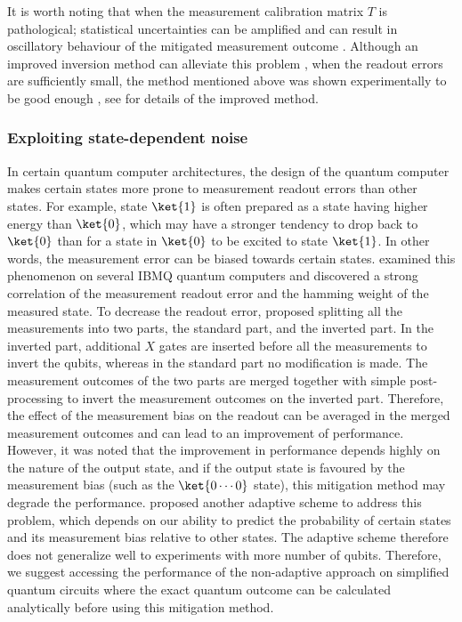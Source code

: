 
It is worth noting that when the measurement calibration matrix $T$ is pathological; statistical uncertainties can be amplified and can result in oscillatory behaviour of the mitigated measurement outcome \cite{nachmanUnfoldingQuantumComputer2020}. Although an improved inversion method can alleviate this problem \cite{nachmanUnfoldingQuantumComputer2020}, when the readout errors are sufficiently small, the method mentioned above was shown experimentally to be good enough \cite{nachmanUnfoldingQuantumComputer2020}, see \citet{nachmanUnfoldingQuantumComputer2020} for details of the improved method.

\subsubsection{Exploiting state-dependent noise}

In certain quantum computer architectures, the design of the quantum computer makes certain states more prone to measurement readout errors than other states. For example, state $\ket{1}$ is often prepared as a state having higher energy than $\ket{0}$, which may have a stronger tendency to drop back to $\ket{0}$ than for a state in $\ket{0}$ to be excited to state $\ket{1}$. In other words, the measurement error can be biased towards certain states. \citet{tannuMitigatingMeasurementErrors2019} examined this phenomenon on several IBMQ quantum computers and discovered a strong correlation of the measurement readout error and the hamming weight of the measured state.
To decrease the readout error, \citet{tannuMitigatingMeasurementErrors2019} proposed splitting all the measurements into two parts, the standard part, and the inverted part. In the inverted part, additional $X$ gates are inserted before all the measurements to invert the qubits, whereas in the standard part no modification is made. The measurement outcomes of the two parts are merged together with simple post-processing to invert the measurement outcomes on the inverted part. Therefore, the effect of the measurement bias on the readout can be averaged in the merged measurement outcomes and can lead to an improvement of performance. However, it was noted that the improvement in performance depends highly on the nature of the output state, and if the output state is favoured by the measurement bias (such as the $\ket{0\cdots 0}$ state), this mitigation method may degrade the performance. \citet{tannuMitigatingMeasurementErrors2019} proposed another adaptive scheme to address this problem, which depends on our ability to predict the probability of certain states and its measurement bias relative to other states. The adaptive scheme therefore does not generalize well to experiments with more number of qubits. Therefore, we suggest accessing the performance of the non-adaptive approach on simplified quantum circuits where the exact quantum outcome can be calculated analytically before using this mitigation method.

